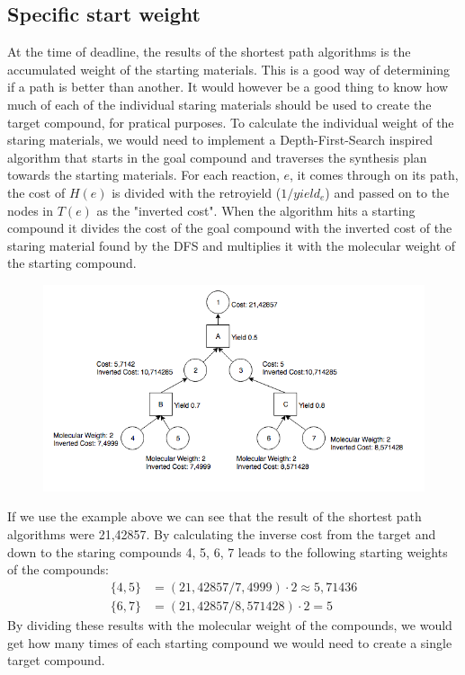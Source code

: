 \documentclass[a4paper,10pt,titlepage]{paper}
\begin{document}
\subsection{Specific start weight}
At the time of deadline, the results of the shortest path algorithms is the accumulated weight of the starting materials. This is a good way of determining if a path is better than another. It would however be a good thing to know how much of each of the individual staring materials should be used to create the target compound, for pratical purposes. To calculate the individual weight of the staring materials, we would need to implement a Depth-First-Search inspired algorithm that starts in the goal compound and traverses the synthesis plan towards the starting materials. For each reaction, $e$, it comes through on its path, the cost of $H(e)$ is divided with the retroyield ($1/yield_e$) and passed on to the nodes in $T(e)$ as the "inverted cost". When the algorithm hits a starting compound it divides the cost of the goal compound with the inverted cost of the staring material found by the DFS and multiplies it with the molecular weight of the starting compound.
\begin{figure}[H]
\centering
\includegraphics[scale=0.5]{Billeder/StartingMaterialCalculation.png}
\end{figure}
If we use the example above we can see that the result of the shortest path algorithms were 21,42857. By calculating the inverse cost from the target and down to the staring compounds 4, 5, 6, 7 leads to the following starting weights of the compounds:
\begin{align}
\{4,5\} &= (21,42857/7,4999) \cdot 2 \approx 5,71436\\
\{6,7\} &= (21,42857/8,571428) \cdot 2 = 5
\end{align}
By dividing these results with the molecular weight of the compounds, we would get how many times of each starting compound we would need to create a single target compound.
\end{document}
